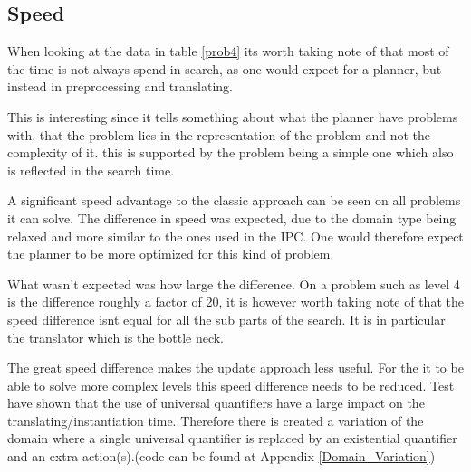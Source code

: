 			
		\subsection{Speed}
			When looking at the data in table \ref{prob4} its worth taking note of that most of the time is not always spend in search, as one would expect for a planner, but instead in preprocessing and translating. 
			
			This is interesting since it tells something about what the planner have problems with.
			that the problem lies in the representation of the problem and not the complexity of it. this is supported by the problem being a simple one which also is reflected in the search time.
			
		
			A significant speed advantage to the classic approach can be seen on all problems it can solve. The difference in speed was expected, due to the domain type being relaxed and more similar to the ones used in the IPC. One would therefore expect the planner to be more optimized for this kind of problem.
			

			What wasn't expected was how large the difference. On a problem such as level 4 is the difference roughly a factor of 20, it is however worth taking note of that the speed difference isnt equal for all the sub parts of the search. It is in particular the translator which is the bottle neck. 
			
			The great speed difference makes the update approach less useful. For the it to be able to solve more complex levels this speed difference needs to be reduced. Test have shown that the use of universal quantifiers have a large impact on the translating/instantiation time. Therefore there is created a variation of the domain where a single universal quantifier is replaced by an existential quantifier and an extra action(s).(code can be found at Appendix \ref{Domain_Variation})


